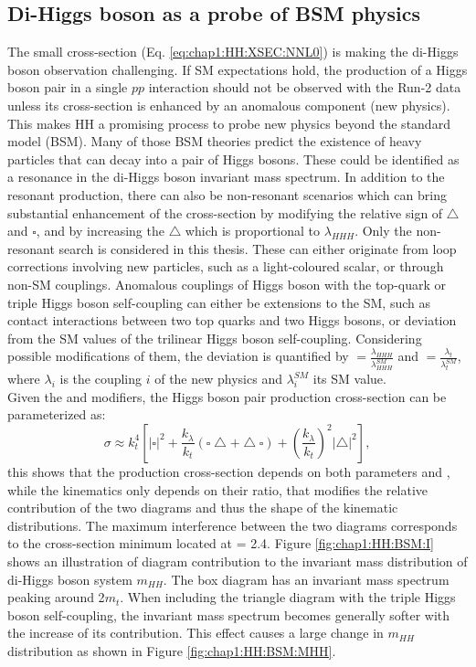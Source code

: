 \subsection{Di-Higgs boson as a probe of BSM physics}
\label{chap1:HH:BSM}
The small cross-section (Eq. \ref{eq:chap1:HH:XSEC:NNL0}) is making the di-Higgs boson observation challenging. 
If SM expectations hold, the production of a Higgs boson pair in a single $pp$ interaction should not be observed with the Run-2 data unless its cross-section is enhanced by an anomalous component (new physics). 
This makes HH a promising process to probe new physics beyond the standard model (BSM). 
Many of those BSM theories predict the existence of heavy particles that can decay into a pair of Higgs bosons. 
These could be identified as a resonance in the di-Higgs boson invariant mass spectrum. 
In addition to the resonant production, there can also be non-resonant scenarios which can bring substantial enhancement of the cross-section by modifying the relative sign of $\bigtriangleup$ and $\square$, and by increasing the $\bigtriangleup$ which is proportional to $\lambda_{HHH}$. Only the non-resonant search is considered in this thesis. These can either originate from loop corrections involving new particles, such as a light-coloured scalar, or through non-SM couplings. Anomalous couplings of Higgs boson with the top-quark or triple Higgs boson self-coupling can either be extensions to the SM, such as contact interactions between two top quarks and two Higgs bosons, or deviation from the SM values of the trilinear Higgs boson self-coupling. Considering possible modifications of them, the deviation is quantified by \kl $ = \frac{\lambda_{HHH}}{\lambda_{HHH}^{SM}}$ and \kt $= \frac{\lambda_{t}}{\lambda_{t}^{SM}}$, where $\lambda_{i}$ is the coupling $i$ of the new physics and $\lambda_{i}^{SM}$ its SM value. \\
Given the \kt and \kl modifiers, the Higgs boson pair production cross-section can be parameterized as:
\begin{equation}
  \sigma \approx k_{t}^{4}\left[|\square|^{2}+\frac{k_{\lambda}}{k_{t}}(\square\bigtriangleup+\bigtriangleup \square)+\left(\frac{k_{\lambda}}{k_{t}}\right)^{2}|\bigtriangleup|^{2}\right], 
  \label{eq:chap1:HH:XSEC:Param}
\end{equation}
this shows that the production cross-section depends on both parameters \kt and \kl, while the kinematics only depends on their ratio, that modifies the relative contribution of the two diagrams and thus the shape of the kinematic distributions. The maximum interference between the two diagrams corresponds to the cross-section minimum located at \kl = 2.4\kt. Figure \ref{fig:chap1:HH:BSM:I} shows an illustration of diagram contribution to the invariant mass distribution of di-Higgs boson system $m_{HH}$. The box diagram has an invariant mass spectrum peaking around 2$m_t$. When including the triangle diagram with the triple Higgs boson self-coupling, the invariant mass spectrum becomes generally softer with the increase of its contribution. This effect causes a large change in $m_{HH}$ distribution as shown in Figure \ref{fig:chap1:HH:BSM:MHH}.
